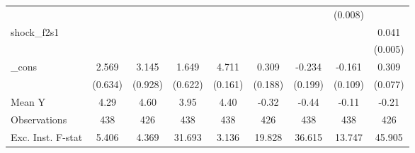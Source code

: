 {\begin{tabular}{l*{8}{c}}
            &                     &                     &                     &                     &                     &                     &     (0.008)         &                     \\
\addlinespace
shock\_f2s1  &                     &                     &                     &                     &                     &                     &                     &       0.041\sym{***}\\
            &                     &                     &                     &                     &                     &                     &                     &     (0.005)         \\
\addlinespace
\_cons      &       2.569\sym{***}&       3.145\sym{***}&       1.649\sym{**} &       4.711\sym{***}&       0.309         &      -0.234         &      -0.161         &       0.309\sym{***}\\
            &     (0.634)         &     (0.928)         &     (0.622)         &     (0.161)         &     (0.188)         &     (0.199)         &     (0.109)         &     (0.077)         \\
\midrule
Mean Y      &        4.29         &        4.60         &        3.95         &        4.40         &       -0.32         &       -0.44         &       -0.11         &       -0.21         \\
Observations&         438         &         426         &         438         &         438         &         426         &         438         &         438         &         426         \\
Exc. Inst. F-stat&       5.406         &       4.369         &      31.693         &       3.136         &      19.828         &      36.615         &      13.747         &      45.905         \\
\bottomrule
\end{tabular}
}
